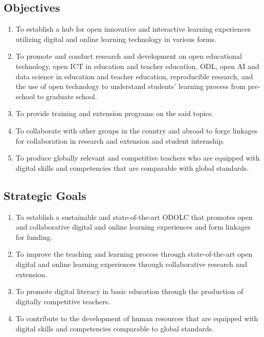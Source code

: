 \documentclass[
  12pt,
  foliopaper,
  DIV=11,
  numbers=noendperiod]{scrartcl}
\begin{document}
\hypertarget{objectives}{%
\subsection{Objectives}\label{objectives}}

\begin{enumerate}
\def\labelenumi{\arabic{enumi}.}
\item
  To establish a hub for open innovative and interactive learning
  experiences utilizing digital and online learning technology in
  various forms.
\item
  To promote and conduct research and development on open educational
  technology, open ICT in education and teacher education, ODL, open AI
  and data science in education and teacher education, reproducible
  research, and the use of open technology to understand students'
  learning process from pre-school to graduate school.
\item
  To provide training and extension programs on the said topics.
\item
  To collaborate with other groups in the country and abroad to forge
  linkages for collaboration in research and extension and student
  internship.
\item
  To produce globally relevant and competitive teachers who are equipped
  with digital skills and competencies that are comparable with global
  standards.
\end{enumerate}

\hypertarget{strategic-goals}{%
\subsection{Strategic Goals}\label{strategic-goals}}

\begin{enumerate}
\def\labelenumi{\arabic{enumi}.}
\item
  To establish a sustainable and state-of-the-art ODOLC that promotes
  open and collaborative digital and online learning experiences and
  form linkages for funding.
\item
  To improve the teaching and learning process through state-of-the-art
  open digital and online learning experiences through collaborative
  research and extension.
\item
  To promote digital literacy in basic education through the production
  of digitally competitive teachers.
\item
  To contribute to the development of human resources that are equipped
  with digital skills and competencies comparable to global standards.
\end{enumerate}
\end{document}
